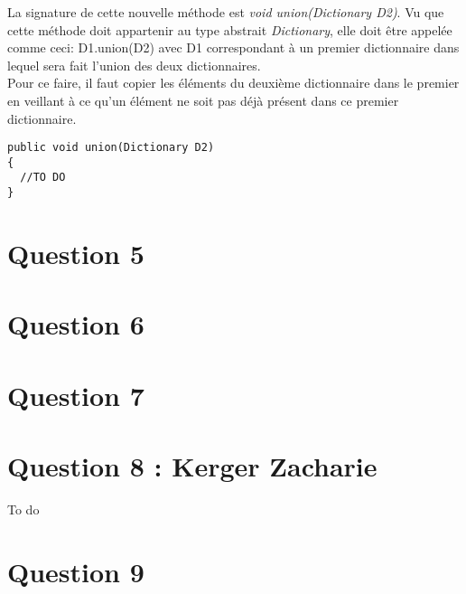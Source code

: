 \documentclass[10pt,a4paper]{article}
\begin{document}
La signature de cette nouvelle méthode est \emph{void union(Dictionary D2)}. Vu que cette méthode doit appartenir au type abstrait \emph{Dictionary}, elle doit être appelée comme ceci: D1.union(D2) avec D1 correspondant à un premier dictionnaire dans lequel sera fait l'union des deux dictionnaires. \\
\newline
Pour ce faire, il faut copier les éléments du deuxième dictionnaire dans le premier en veillant à ce qu'un  élément ne soit pas déjà présent dans ce premier dictionnaire.

\begin{lstlisting}
public void union(Dictionary D2)
{
  //TO DO
}
\end{lstlisting}

\section*{Question 5}
\section*{Question 6}
\section*{Question 7}
\section*{Question 8 : Kerger Zacharie}
To do
\section*{Question 9}
\end{document}
